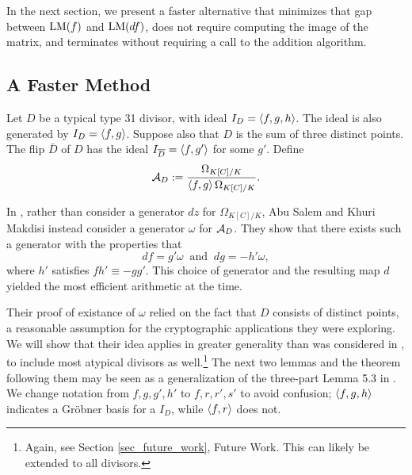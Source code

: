 In the next section, we present a faster alternative
that minimizes that gap between $\LM(f)$ and $\LM(df)$,
does not require computing the image of the matrix,
and terminates without requiring a call to the addition algorithm.




\subsection{A Faster Method}

Let $D$ be a typical type 31 divisor, with ideal $I_D = \pid{f,g,h}$.
The ideal is also generated by $I_D = \pid{f,g}$.
Suppose also that $D$ is the sum of three distinct points.
The flip $\bar D$ of $D$ has the ideal $I_{\bar D} = \pid{f, g'}$ for some $g'$.
Define
\[ \cal A_D := \frac {\Omega_{K[C]/K}} {\pid{f,g} \Omega_{K[C]/K}}. \]

In \cite{salem07}, rather than consider a generator $dz$ for $\Omega_{K[C]/K}$,
Abu Salem and Khuri Makdisi instead consider a generator $\omega$ for $\cal A_D$.
They show that there exists such a generator with the properties that
\[ df = g'\omega ~\text{ and }~ dg = -h'\omega, \]
where $h'$ satisfies $fh' \equiv -gg'$.
This choice of generator and the resulting map $d$ yielded the most efficient arithmetic at the time.

Their proof of existance of $\omega$ relied on the fact that $D$ consists of distinct points,
a reasonable assumption for the cryptographic applications they were exploring.
We will show that their idea applies in greater generality than was considered in \cite{salem07},
to include most atypical divisors as well.\footnote
{Again, see Section \ref{sec_future_work}, Future Work. This can likely be extended to all divisors.}
The next two lemmas and the theorem following them may be seen
as a generalization of the three-part Lemma 5.3 in \cite{salem07}.
We change notation from $f,g,g',h'$ to $f,r,r',s'$ to avoid confusion;
$\pid{f,g,h}$ indicates a Gr\"obner basis for a $I_D$, while $\pid{f,r}$ does not.

